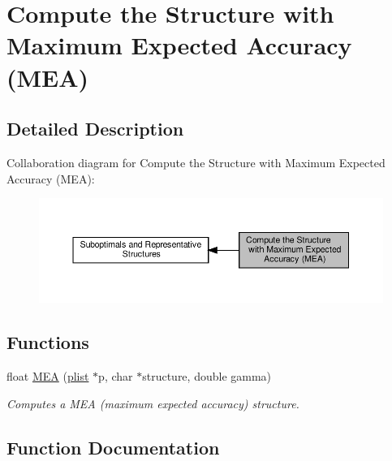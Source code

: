\hypertarget{group__mea__fold}{}\section{Compute the Structure with Maximum Expected Accuracy (M\+EA)}
\label{group__mea__fold}


\subsection{Detailed Description}
Collaboration diagram for Compute the Structure with Maximum Expected Accuracy (M\+EA)\+:
\nopagebreak
\begin{figure}[H]
\begin{center}
\leavevmode
\includegraphics[width=350pt]{group__mea__fold}
\end{center}
\end{figure}
\subsection*{Functions}
\begin{DoxyCompactItemize}
\item 
float \hyperlink{group__mea__fold_ga396ec6144c6a74fcbab4cea6b42d76c3}{M\+EA} (\hyperlink{group__data__structures_ga9608eed021ebfbdd7a901cfdc446c8e9}{plist} $\ast$p, char $\ast$structure, double gamma)
\begin{DoxyCompactList}\small\item\em Computes a M\+EA (maximum expected accuracy) structure. \end{DoxyCompactList}\end{DoxyCompactItemize}


\subsection{Function Documentation}
\mbox{\label{group__mea__fold_ga396ec6144c6a74fcbab4cea6b42d76c3}} 
